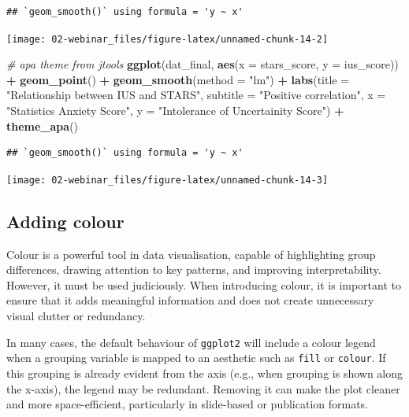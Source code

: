 \documentclass[
  oneside]{book}
\newenvironment{Shaded}{\begin{snugshade}}{\end{snugshade}}
\newcommand{\AttributeTok}[1]{\textcolor[rgb]{0.13,0.29,0.53}{#1}}
\newcommand{\CommentTok}[1]{\textcolor[rgb]{0.56,0.35,0.01}{\textit{#1}}}
\newcommand{\FunctionTok}[1]{\textcolor[rgb]{0.13,0.29,0.53}{\textbf{#1}}}
\newcommand{\NormalTok}[1]{#1}
\newcommand{\SpecialCharTok}[1]{\textcolor[rgb]{0.81,0.36,0.00}{\textbf{#1}}}
\newcommand{\StringTok}[1]{\textcolor[rgb]{0.31,0.60,0.02}{#1}}
\begin{document}
\begin{verbatim}
## `geom_smooth()` using formula = 'y ~ x'
\end{verbatim}

\begin{center}\texttt{[image: 02-webinar\_files/figure-latex/unnamed-chunk-14-2]} \end{center}

\begin{Shaded}
\begin{Highlighting}[]
\CommentTok{\# apa theme from jtools}
\FunctionTok{ggplot}\NormalTok{(dat\_final, }\FunctionTok{aes}\NormalTok{(}\AttributeTok{x =}\NormalTok{ stars\_score, }\AttributeTok{y =}\NormalTok{ ius\_score)) }\SpecialCharTok{+}
  \FunctionTok{geom\_point}\NormalTok{() }\SpecialCharTok{+}
  \FunctionTok{geom\_smooth}\NormalTok{(}\AttributeTok{method =} \StringTok{"lm"}\NormalTok{) }\SpecialCharTok{+}
  \FunctionTok{labs}\NormalTok{(}\AttributeTok{title =} \StringTok{"Relationship between IUS and STARS"}\NormalTok{,}
       \AttributeTok{subtitle =} \StringTok{"Positive correlation"}\NormalTok{,}
       \AttributeTok{x =} \StringTok{"Statistics Anxiety Score"}\NormalTok{,}
       \AttributeTok{y =} \StringTok{"Intolerance of Uncertainity Score"}\NormalTok{) }\SpecialCharTok{+}
  \FunctionTok{theme\_apa}\NormalTok{()}
\end{Highlighting}
\end{Shaded}

\begin{verbatim}
## `geom_smooth()` using formula = 'y ~ x'
\end{verbatim}

\begin{center}\texttt{[image: 02-webinar\_files/figure-latex/unnamed-chunk-14-3]} \end{center}

\subsection{Adding colour}\label{adding-colour}

Colour is a powerful tool in data visualisation, capable of highlighting group differences, drawing attention to key patterns, and improving interpretability. However, it must be used judiciously. When introducing colour, it is important to ensure that it adds meaningful information and does not create unnecessary visual clutter or redundancy.

In many cases, the default behaviour of \texttt{ggplot2} will include a colour legend when a grouping variable is mapped to an aesthetic such as \texttt{fill} or \texttt{colour}. If this grouping is already evident from the axis (e.g., when grouping is shown along the x-axis), the legend may be redundant. Removing it can make the plot cleaner and more space-efficient, particularly in slide-based or publication formats.
\end{document}

